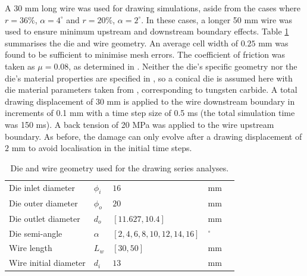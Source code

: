 \documentclass[sn-mathphys,Numbered]{sn-jnl}%
\begin{document}
A $30$ mm long wire was used for drawing simulations, aside from the cases where $r=36\%$, $\alpha=4^{\circ}$ and $r=20\%$, $\alpha=2^{\circ}$.
In these cases, a longer 50 mm wire was used to ensure minimum upstream and downstream boundary effects.
Table \ref{tab:drawing_series_die_geom} summarises the die and wire geometry.
An average cell width of $0.25$ mm was found to be sufficient to minimise mesh errors.
The coefficient of friction was taken as $\mu = 0.08$, as determined in \citet{roh_process_2021}.
Neither the die's specific geometry nor the die's material properties are specified in \citet{roh_process_2021}, so a conical die is assumed here with die material parameters taken from \citet{clancy_improving_2019}, corresponding to tungsten carbide.
A total drawing displacement of 30 mm is applied to the wire downstream boundary in increments of 0.1 mm with a time step size of 0.5 ms (the total simulation time was 150 ms).
A back tension of 20 MPa was applied to the wire upstream boundary.
As before, the damage can only evolve after a drawing displacement of $2$ mm to avoid localisation in the initial time steps.
\begin{table}[htb]
	\centering
		\begin{tabular}{lllll} \hline
		    Die inlet diameter & $\phi_i$ & $16$ & mm \\
		    Die outer diameter & $\phi_o$ & $20$ & mm \\
	      	    Die outlet diameter & $d_o$ & $[11.627, 10.4]$ & mm \\
		    Die semi-angle & $\alpha$ &  $[2, 4, 6, 8, 10, 12, 14, 16] $ & $^{\circ}$ \\
		    Wire length & $L_w$ & $[30, 50]$ & mm \\
		    Wire initial diameter & $d_i$ & $13$ & mm \\
		    \hline
		\end{tabular}
	\caption{Die and wire geometry used for the drawing series analyses.}
	\label{tab:drawing_series_die_geom}
\end{table}
\end{document}
